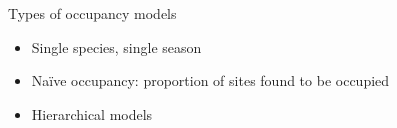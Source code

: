 \documentclass{beamer}
\begin{document}
\begin{frame}{Types of occupancy models}
	\begin{itemize}
		\item Single species, single season
		\item Na\"ive occupancy: proportion of sites found to be occupied
		\item Hierarchical models
	\end{itemize}
	\begin{center}
	\end{center}
\end{frame}
\end{document}

